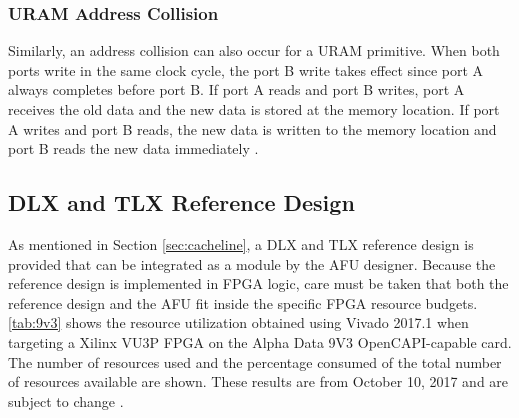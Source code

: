 \subsubsection{URAM Address Collision}
Similarly, an address collision can also occur for a URAM primitive. When both ports write in the same clock cycle, the port B write takes effect since port A always completes before port B. If port A reads and port B writes, port A receives the old data and the new data is stored at the memory location. If port A writes and port B reads, the new data is written to the memory location and port B reads the new data immediately \cite{xilinx-wp477}.






\subsection{DLX and TLX Reference Design}
\label{sec:dlxtlx}
As mentioned in Section \ref{sec:cacheline}, a DLX and TLX reference design is provided that can be integrated as a module by the AFU designer. Because the reference design is implemented in FPGA logic, care must be taken that both the reference design and the AFU fit inside the specific FPGA resource budgets. \autoref{tab:9v3} shows the resource utilization obtained using Vivado 2017.1 when targeting a Xilinx VU3P FPGA on the Alpha Data 9V3 OpenCAPI-capable card. The number of resources used and the percentage consumed of the total number of resources available are shown. These results are from October 10, 2017 and are subject to change \cite{opencapi-enablement}.

